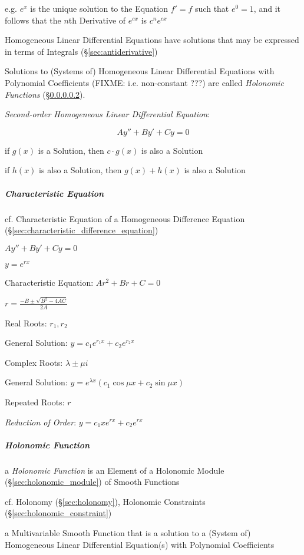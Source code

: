 e.g. $e^x$ is the unique solution to the Equation $f' = f$ such that $e^0 = 1$,
and it follows that the $n$th Derivative of $e^{cx}$ is $c^n e^{cx}$

Homogeneous Linear Differential Equations have solutions that may be expressed
in terms of Integrals (\S\ref{sec:antiderivative})

Solutions to (Systems of) Homogeneous Linear Differential Equations with
Polynomial Coefficients (FIXME: i.e. non-constant ???) are called
\emph{Holonomic Functions} (\S\ref{sec:holonomic_function}).

\emph{Second-order Homogeneous Linear Differential Equation}:

\[
  A y'' + B y' + C y = 0
\]

if $g(x)$ is a Solution, then $c\cdot{g(x)}$ is also a Solution

if $h(x)$ is also a Solution, then $g(x) + h(x)$ is also a Solution



\subparagraph{Characteristic Equation}\label{sec:characteristic_equation}\hfill

cf. Characteristic Equation of a Homogeneous Difference Equation
(\S\ref{sec:characteristic_difference_equation})

$A y'' + B y' + C y = 0$

$y = e^{rx}$

Characteristic Equation: $Ar^2 + Br + C = 0$

$r = \frac{-B \pm \sqrt{B^2 - 4AC}}{2A}$

Real Roots: $r_1, r_2$

General Solution: $y = c_1e^{r_1x} + c_2e^{r_2x}$

Complex Roots: $\lambda \pm \mu i$

General Solution: $y = e^{\lambda x}(c_1 \cos\mu{x} + c_2 \sin\mu{x})$

Repeated Roots: $r$

\emph{Reduction of Order}: $y = c_1 x e^{rx} + c_2 e^{rx}$



\subparagraph{Holonomic Function}\label{sec:holonomic_function}\hfill

a \emph{Holonomic Function} is an Element of a Holonomic Module
(\S\ref{sec:holonomic_module}) of Smooth Functions

\fist cf. Holonomy (\S\ref{sec:holonomy}), Holonomic Constraints
(\S\ref{sec:holonomic_constraint})

a Multivariable Smooth Function that is a solution to a (System of) Homogeneous
Linear Differential Equation(s) with Polynomial Coefficients

